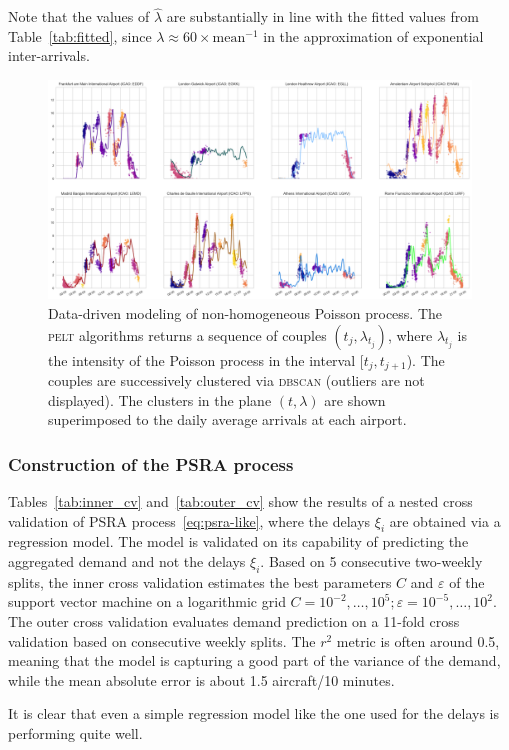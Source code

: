 \documentclass[draft,review]{elsarticle}
\newcommand{\PELT}{\textsc{pelt}}
\newcommand{\DBSCAN}{\textsc{dbscan}}
\begin{document}
\begin{rmk}
	Note that the values of \(\hat{\lambda}\) are substantially in line with the fitted values from Table~\ref{tab:fitted}, since \(\lambda \approx 60 \times \text{mean}^{-1}\) in the approximation of exponential inter-arrivals.
\end{rmk}

\begin{figure}
    \includegraphics[width=\textwidth]{DDPoisson}
    \caption{Data-driven modeling of non-homogeneous Poisson process. The \PELT{} algorithms returns a sequence of couples \((t_j,\lambda_{t_j})\), where \(\lambda_{t_j}\) is the intensity of the Poisson process in the interval \([t_j, t_{j+1}\)). The couples are successively clustered via \DBSCAN{} (outliers are not displayed). The clusters in the plane \((t,\lambda)\) are shown superimposed to the daily average arrivals at each airport.}\label{fig:poisson_segmentation}
\end{figure}

\subsubsection{Construction of the \acs{PSRA} process}\label{sec:psra}

Tables~\ref{tab:inner_cv} and~\ref{tab:outer_cv} show the results of a nested cross validation of \ac{PSRA} process~\eqref{eq:psra-like}, where the delays \(\xi_i\) are obtained via a regression model.
The model is validated on its capability of predicting the aggregated demand and not the delays \(\xi_i\).
Based on 5 consecutive two-weekly splits, the inner cross validation estimates the best parameters \(C\) and \(\varepsilon\) of the support vector machine on a logarithmic grid \(C = 10^{-2},\ldots, 10^5; \varepsilon = 10^{-5},\dots,10^2\).
The outer cross validation evaluates demand prediction on a 11-fold cross validation based on consecutive weekly splits.
The \(r^2\) metric is often around 0.5, meaning that the model is capturing a good part of the variance of the demand, while the mean absolute error is about 1.5 aircraft/10 minutes.
\begin{kpt}
  It is clear that even a simple regression model like the one used for the delays is performing quite well.
\end{kpt}
\end{document}
